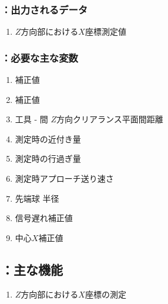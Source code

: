 \subsubsection{\MXOface：出力されるデータ}
\begin{enumerate}[label*=\sarrow]
\item $Z$方向\KeywayCenter 部における\KeywayCenter$X$座標測定値
\end{enumerate}

\subsubsection{\MXOface：必要な主な変数}
\begin{enumerate}[label*=\sarrow]
\item \KeywayPos 補正値
\item \KeywayWidth 補正値
\item 工具 - \EndFace 間 $Z$方向クリアランス平面間距離
\item \TouchSensorProbe 測定時の近付き量
\item \TouchSensorProbe 測定時の行過ぎ量
\item \TouchSensorProbe 測定時アプローチ送り速さ
\item \TouchSensorProbe 先端球 半径
\item \TouchSensorProbe 信号遅れ補正値
\item \TouchSensorProbe 中心$X$補正値
\end{enumerate}


\subsection{\MXOface：主な機能}
\begin{enumerate}[label*=\sarrow]
\item $Z$方向\KeywayCenter 部における\KeywayCenter$X$座標の測定
\end{enumerate}


\clearpage
